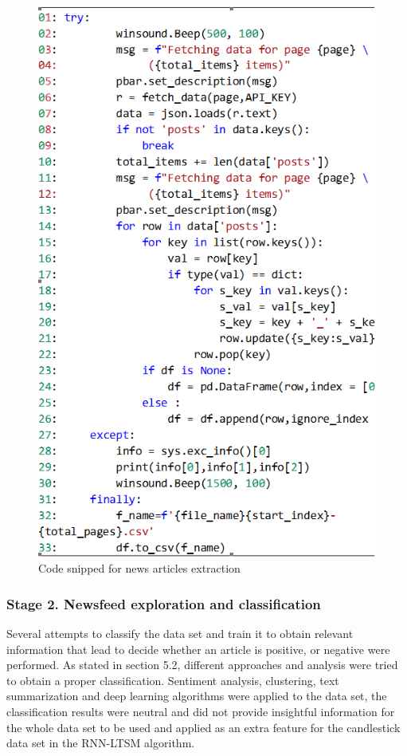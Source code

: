 \begin{figure}[H]
   \centering
   \includegraphics[width=\linewidth]{fig/CodeSnippetNewsContentExtraction.png}
    \caption{Code snipped for news articles extraction}
    \label{fig:CodeSnippetNewsContent}
\end{figure}

\subsubsection{Stage 2. Newsfeed exploration and classification}

Several attempts to classify the data set and train it to obtain relevant information that lead to decide whether an article is positive, or negative were performed. As stated in section 5.2, different approaches and analysis were tried to obtain a proper classification. Sentiment analysis, clustering, text summarization and deep learning algorithms were applied to the data set, the classification results were neutral and did not provide insightful information for the whole data set to be used and applied as an extra feature for the candlestick data set in the RNN-LTSM algorithm.

